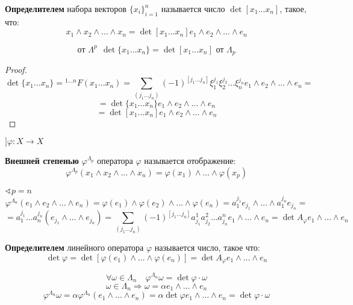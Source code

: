 \begin{definition}
    \textbf{Определителем} набора векторов $\{x_i\}_{i=1}^n$ называется число $\det [x_1\ldots x_n]$, такое, что:
    $$x_1\wedge x_2\wedge\ldots\wedge x_n = \det[x_1\ldots x_n]e_1\wedge e_2\wedge\ldots\wedge e_n$$
\end{definition}
\begin{lemma}
    $$\text{от } \Lambda^p\ \ \det \{x_1\ldots x_n\}=\det[x_1\ldots x_n] \text{ от } \Lambda_p$$
\end{lemma}
\begin{proof}
    $$\det \{x_1\ldots x_n\}={}^{1\ldots n} F(x_1\ldots x_n) = \sum\limits_{(j_1\ldots j_n)} (-1)^{[j_1\ldots j_n]} \xi_1^{j_1}\xi_2^{j_2}\ldots \xi_n^{j_n}e_1\wedge e_2\wedge\ldots\wedge e_n=$$
    $$=\det\{x_1\ldots x_n\}e_1\wedge e_2\wedge\ldots\wedge e_n$$
    $$=\det[x_1\ldots x_n]e_1\wedge e_2\wedge\ldots\wedge e_n$$
\end{proof}

\begin{definition}
    $] \varphi : X \to X$

    \textbf{Внешней степенью} $\varphi^{\Lambda_p}$ оператора $\varphi$ называется отображение:
    $$\varphi^{\Lambda_p}(x_1\wedge x_2\wedge\ldots\wedge x_n) = \varphi(x_1)\wedge\ldots\wedge\varphi(x_p)$$
\end{definition}

$\sphericalangle p=n$
$$\varphi^{\Lambda_n}(e_1\wedge e_2\wedge\ldots\wedge e_n)=\varphi(e_1)\wedge\varphi(e_2)\wedge\ldots\wedge\varphi(e_n)=a^{j_1}_1e_{j_1}\wedge\ldots\wedge a^{j_n}_1e_{j_n}=$$
$$=a_1^{j_1}\ldots a_n^{j_n}(e_{j_1}\wedge\ldots\wedge e_{j_n})=\sum\limits_{(j_1\ldots j_n)}(-1)^{[j_1\ldots j_n]}a^1_{j_1}a^2_{j_2}\ldots a^n_{j_n} e_1\wedge\ldots\wedge e_n=\det A_\varphi e_1\wedge\ldots\wedge e_n$$

\begin{definition}
    \textbf{Определителем} линейного оператора $\varphi$ называется число, такое что:
    $$\det \varphi = \det [\varphi(e_1)\wedge\ldots\wedge \varphi(e_n)]=\det A_\varphi e_1\wedge\ldots\wedge e_n$$
\end{definition}

\begin{remark}
    $$\forall \omega\in\Lambda_n \quad \varphi^{\Lambda_n}\omega=\det \varphi \cdot \omega$$
    $$\omega\in\Lambda_n\Rightarrow \omega=\alpha e_1\wedge\ldots\wedge e_n$$
    $$\varphi^{\Lambda_n}\omega=\alpha\varphi^{\Lambda_n}(e_1\wedge\ldots\wedge e_n)=\alpha\det \varphi e_1\wedge\ldots\wedge e_n = \det \varphi \cdot \omega$$
\end{remark}

